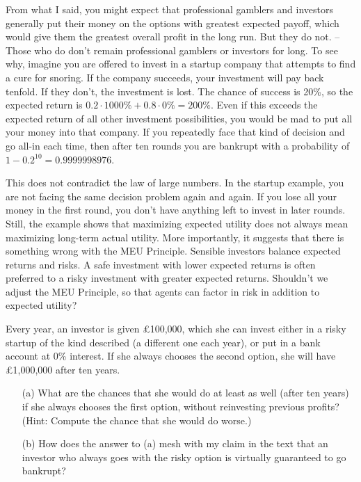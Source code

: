 
From what I said, you might expect that professional gamblers and
investors generally put their money on the options with greatest
expected payoff, which would give them the greatest overall profit in
the long run. But they do not. -- Those who do don't remain
professional gamblers or investors for long. To see why, imagine you
are offered to invest in a startup company that attempts to find a
cure for snoring. If the company succeeds, your investment will pay
back tenfold. If they don't, the investment is lost. The chance of
success is 20\%, so the expected return is
$0.2 \cdot 1000\% + 0.8 \cdot 0\% = 200\%$. Even if this exceeds the
expected return of all other investment possibilities, you would be
mad to put all your money into that company. If you repeatedly face
that kind of decision and go all-in each time, then after ten rounds
you are bankrupt with a probability of $1-0.2^{10} = 0.9999998976$.%

This does not contradict the law of large numbers. In the startup
example, you are not facing the same decision problem again and
again. If you lose all your money in the first round, you don't have
anything left to invest in later rounds. Still, the example shows that
maximizing expected utility does not always mean maximizing long-term
actual utility. More importantly, it suggests that there is something
wrong with the MEU Principle. Sensible investors balance expected
returns and risks. A safe investment with lower expected returns is
often preferred to a risky investment with greater expected returns.
Shouldn't we adjust the MEU Principle, so that agents can factor in
risk in addition to expected utility?

\begin{exercise2}
  Every year, an investor is given £100,000, which she can invest
  either in a risky startup of the kind described (a different one
  each year), or put in a bank account at 0\% interest. If she always
  chooses the second option, she will have £1,000,000 after ten years.
  \begin{enumerate}
  \item[(a)] What are the chances that she would do at least as well
    (after ten years) if she always chooses the first option, without
    reinvesting previous profits? (Hint: Compute the chance that she
    would do worse.)
  \item[(b)] How does the answer to (a) mesh with my claim in the text
    that an investor who always goes with the risky option is
    virtually guaranteed to go bankrupt?
  \end{enumerate}
\end{exercise2}

